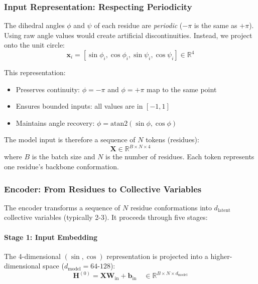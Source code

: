 \documentclass[12pt,a4paper]{article}
\begin{document}
\subsubsection{Input Representation: Respecting Periodicity}

The dihedral angles $\phi$ and $\psi$ of each residue are \textit{periodic} ($-\pi$ is the same as $+\pi$). Using raw angle values would create artificial discontinuities. Instead, we project onto the unit circle:
\begin{equation}
\mathbf{x}_i = [\sin \phi_i, \cos \phi_i, \sin \psi_i, \cos \psi_i] \in \mathbb{R}^4
\end{equation}

This representation:
\begin{itemize}
    \item Preserves continuity: $\phi = -\pi$ and $\phi = +\pi$ map to the same point
    \item Ensures bounded inputs: all values are in $[-1, 1]$
    \item Maintains angle recovery: $\phi = \text{atan2}(\sin \phi, \cos \phi)$
\end{itemize}

The model input is therefore a sequence of $N$ tokens (residues):
\begin{equation}
\mathbf{X} \in \mathbb{R}^{B \times N \times 4}
\end{equation}
where $B$ is the batch size and $N$ is the number of residues. Each token represents one residue's backbone conformation.

\subsubsection{Encoder: From Residues to Collective Variables}

The encoder transforms a sequence of $N$ residue conformations into $d_{\text{latent}}$ collective variables (typically 2-3). It proceeds through five stages:

\paragraph{Stage 1: Input Embedding}
The 4-dimensional $(\sin, \cos)$ representation is projected into a higher-dimensional space ($d_{\text{model}} = 64$-$128$):
\begin{equation}
\mathbf{H}^{(0)} = \mathbf{X} \mathbf{W}_{\text{in}} + \mathbf{b}_{\text{in}} \quad \in \mathbb{R}^{B \times N \times d_{\text{model}}}
\end{equation}
\end{document}

